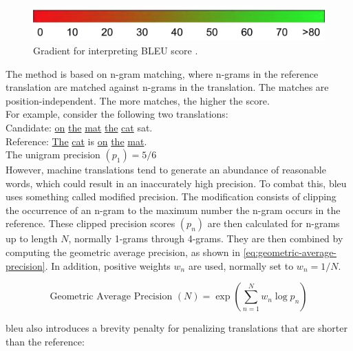 \begin{figure}
    \centering
    \includegraphics[width=\textwidth,keepaspectratio]{figures/bleu_score_range.png}
    \caption{Gradient for interpreting BLEU score \textcite{lavie2011evaluating}.}
    \label{fig:bleu}
\end{figure}
The method is based on n-gram matching, where n-grams in the reference translation are matched against n-grams in the translation. The matches are position-independent. The more matches, the higher the score.\\

\noindent For example, consider the following two translations:\\

\indent Candidate: \underline{on} \underline{the} \underline{mat} \underline{the} \underline{cat} sat.\\
\indent Reference: \underline{The} \underline{cat} is \underline{on} \underline{the} \underline{mat}.\\

\noindent The unigram precision \(\left(p_1\right) = 5/6\)\\

\noindent However, machine translations tend to generate an abundance of reasonable words, which could result in an inaccurately high precision. To combat this, \acrshort{bleu} uses something called modified precision\cite{papineni2002bleu}. The modification consists of clipping the occurrence of an n-gram to the maximum number the n-gram occurs in the reference. These clipped precision scores \(\left(p_n\right)\) are then calculated for n-grams up to length \(N\), normally 1-grams through 4-grams. They are then combined by computing the geometric average precision, as shown in \cref{eq:geometric-average-precision}. In addition, positive weights \(w_n\) are used, normally set to \(w_n = 1/N\).

\begin{equation}
    \label{eq:geometric-average-precision}
    \text{Geometric Average Precision $\left(N\right)$} = \exp \left( \sum_{n=1}^{N} w_n \log{p_n} \right)
\end{equation}

\noindent \acrshort{bleu} also introduces a brevity penalty for penalizing translations that are shorter than the reference:

